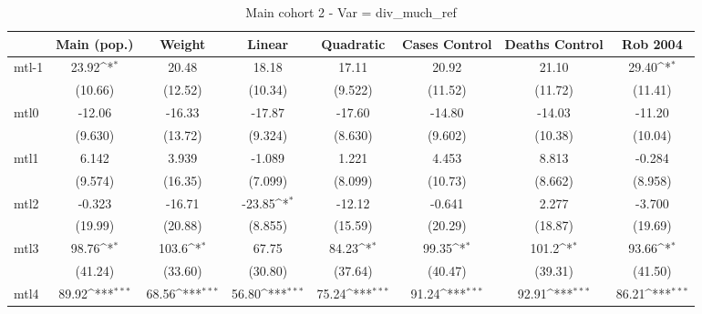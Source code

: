 \documentclass{article}
\begin{document}
{
\def\sym#1{\ifmmode^{#1}\else\(^{#1}\)\fi}
\begin{longtable}{l*{7}{c}}
\caption{Main cohort 2 - Var = div\_much\_ref}\\
\hline\hline\endfirsthead\hline\endhead\hline\endfoot\endlastfoot
                &\multicolumn{1}{c}{Main (pop.)}&\multicolumn{1}{c}{Weight}&\multicolumn{1}{c}{Linear}&\multicolumn{1}{c}{Quadratic}&\multicolumn{1}{c}{Cases Control}&\multicolumn{1}{c}{Deaths Control}&\multicolumn{1}{c}{Rob 2004}\\
\hline
mtl-1           &    23.92\sym{*}  &    20.48         &    18.18         &    17.11         &    20.92         &    21.10         &    29.40\sym{*}  \\
                &  (10.66)         &  (12.52)         &  (10.34)         &  (9.522)         &  (11.52)         &  (11.72)         &  (11.41)         \\
mtl0            &   -12.06         &   -16.33         &   -17.87         &   -17.60         &   -14.80         &   -14.03         &   -11.20         \\
                &  (9.630)         &  (13.72)         &  (9.324)         &  (8.630)         &  (9.602)         &  (10.38)         &  (10.04)         \\
mtl1            &    6.142         &    3.939         &   -1.089         &    1.221         &    4.453         &    8.813         &   -0.284         \\
                &  (9.574)         &  (16.35)         &  (7.099)         &  (8.099)         &  (10.73)         &  (8.662)         &  (8.958)         \\
mtl2            &   -0.323         &   -16.71         &   -23.85\sym{*}  &   -12.12         &   -0.641         &    2.277         &   -3.700         \\
                &  (19.99)         &  (20.88)         &  (8.855)         &  (15.59)         &  (20.29)         &  (18.87)         &  (19.69)         \\
mtl3            &    98.76\sym{*}  &    103.6\sym{*}  &    67.75         &    84.23\sym{*}  &    99.35\sym{*}  &    101.2\sym{*}  &    93.66\sym{*}  \\
                &  (41.24)         &  (33.60)         &  (30.80)         &  (37.64)         &  (40.47)         &  (39.31)         &  (41.50)         \\
mtl4            &    89.92\sym{***}&    68.56\sym{***}&    56.80\sym{***}&    75.24\sym{***}&    91.24\sym{***}&    92.91\sym{***}&    86.21\sym{***}\\

\end{longtable}}
\end{document}
